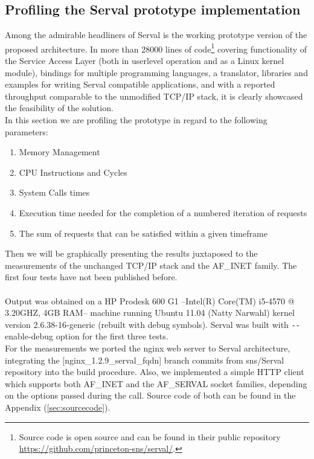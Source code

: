 \subsection{Profiling the Serval prototype implementation}
Among the admirable headliners of Serval is the working prototype version of the proposed architecture.
In more than 28000 lines of code\footnote{Source code is open source and can be found in their public repository\\ \url{https://github.com/princeton-sns/serval/}.} covering functionality of the Service Access Layer (both in userlevel operation and as a Linux kernel module), bindings for multiple programming languages, a translator, libraries and examples for writing Serval compatible applications, and with a reported throughput comparable to the unmodified TCP/IP stack, it is clearly showcased the feasibility of the solution.\\
\indent In this section we are profiling the prototype in regard to the following parameters:
\begin{enumerate}
  \item Memory Management
  \item CPU Instructions and Cycles
  \item System Calls times
  \item Execution time needed for the completion of a numbered iteration of requests
  \item The sum of requests that can be satisfied within a given timeframe
\end{enumerate}
Then we will be graphically presenting the results juxtaposed to the measurements of the unchanged TCP/IP stack and the AF\_INET family. The first four tests have not been published before.

\paragraph{} Output was obtained on a HP Prodesk 600 G1 --Intel(R) Core(TM) i5-4570 @ 3.20GHZ, 4GB RAM-- machine running Ubuntu 11.04 (Natty Narwahl) kernel version 2.6.38-16-generic (rebuilt with debug symbols). Serval was built with \texttt{-{}-}enable-debug option for the first three tests.\\
\indent For the measurements we ported the nginx web server to Serval architecture, integrating the [nginx\_1.2.9\_serval\_fqdn] branch commits from \mbox{sns/Serval} repository into the build procedure.
Also, we implemented a simple HTTP client which supports both AF\_INET and the AF\_SERVAL socket families, depending on the options passed during the call.
Source code of both can be found in the Appendix (\ref{sec:sourcecode}).


\iffalse
gprof
perf
google-profile tools
1) memory (oprofile)
2) CPU cycles (callgrind)
3) system calls time (strace)
4) timed execution of 1000 times
5) requests per second
6) Number of packers per request, bytes sent, packet structure
\fi